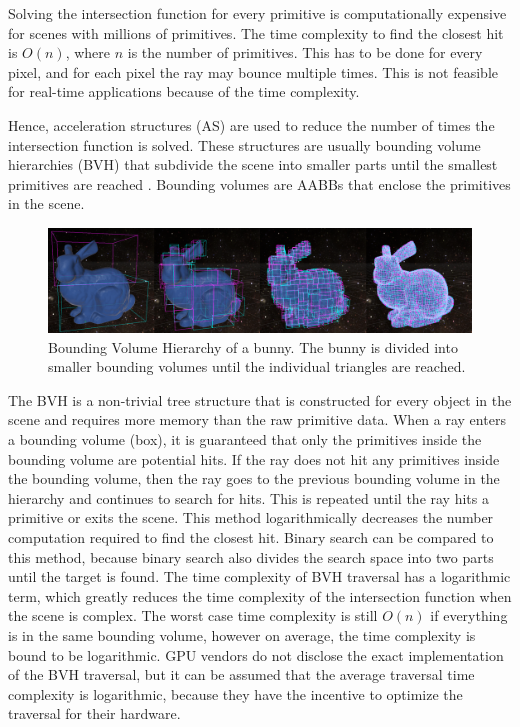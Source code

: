 \documentclass[12pt]{article}
\begin{document}
Solving the intersection function for every primitive is computationally expensive for scenes with millions of primitives.
The time complexity to find the closest hit is $O(n)$, where $n$ is the number of primitives.
This has to be done for every pixel, and for each pixel the ray may bounce multiple times.
This is not feasible for real-time applications because of the time complexity.


Hence, acceleration structures (AS) are used to reduce the number of times the intersection function is solved.
These structures are usually bounding volume hierarchies (BVH) that subdivide the scene into smaller parts until the smallest primitives are reached \parencite{NVIDIA:Raytracing}.
Bounding volumes are AABBs that enclose the primitives in the scene.

\begin{figure}[H]
    \includegraphics[scale=0.22]{BVH-Visualization}
    \caption{
        Bounding Volume Hierarchy of a bunny.
        The bunny is divided into smaller bounding volumes until the individual triangles are reached.
        \parencite{Medium:BVH-Visualization}
    }
    \label{fig:BVH-Visualization}
\end{figure}

The BVH is a non-trivial tree structure that is constructed for every object in the scene and requires more memory than the raw primitive data.
When a ray enters a bounding volume (box), it is guaranteed that only the primitives inside the bounding volume are potential hits.
If the ray does not hit any primitives inside the bounding volume, then the ray goes to the previous bounding volume in the hierarchy and continues
to search for hits. This is repeated until the ray hits a primitive or exits the scene.
This method logarithmically decreases the number computation required to find the closest hit.
Binary search can be compared to this method, because binary search also divides the search space into two parts until the target is found.
The time complexity of BVH traversal has a logarithmic term, which greatly reduces the time complexity of the intersection function
when the scene is complex. The worst case time complexity is still $O(n)$ if everything is in the same bounding volume,
however on average, the time complexity is bound to be logarithmic. GPU vendors do not disclose the exact implementation of the BVH traversal,
but it can be assumed that the average traversal time complexity is logarithmic, because they
have the incentive to optimize the traversal for their hardware.
\end{document}

